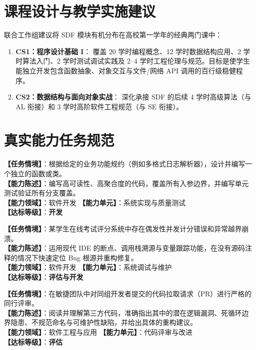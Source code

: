 \section{课程设计与教学实施建议}

联合工作组建议将 SDF 模块有机分布在高校第一学年的经典两门课中：
\begin{enumerate}
    \item \textbf{CS1：程序设计基础 I}：
    覆盖 20 学时编程概念、12 学时数据结构应用、2 学时算法入门、2 学时测试调试实践及 2--4 学时工程伦理与规范。目标是使学生能独立开发包含函数抽象、对象交互与文件/网络 API 调用的百行级稳健程序。
    \item \textbf{CS2：数据结构与面向对象实战}：
    深化承接 SDF 的后续 4 学时高级算法（与 AL 衔接）和 3 学时高阶软件工程规范（与 SE 衔接）。
\end{enumerate}

\section{真实能力任务规范}

\begin{taskbox}[任务 1：模块化功能组件的规范开发与单元测试]
\textbf{【任务情境】}：根据给定的业务功能规约（例如多格式日志解析器），设计并编写一个独立的函数或类。\\
\textbf{【能力陈述】}：编写高可读性、高聚合度的代码，覆盖所有入参边界，并编写单元测试验证所有分支覆盖。\\
\textbf{【能力领域】}：软件开发 \quad \textbf{【能力单元】}：系统实现与质量测试\\
\textbf{【达标等级】}：\textbf{开发}
\end{taskbox}

\begin{taskbox}[任务 2：复杂逻辑缺陷的断点调试与定位修复]
\textbf{【任务情境】}：某学生在线考试评分系统中存在偶发性并发计分错误和异常越界崩溃。\\
\textbf{【能力陈述】}：运用现代 IDE 的断点、调用栈溯源与变量跟踪功能，在没有源码注释的情况下快速定位 Bug 根源并重构修复。\\
\textbf{【能力领域】}：软件开发 \quad \textbf{【能力单元】}：系统调试与维护\\
\textbf{【达标等级】}：\textbf{评估与开发}
\end{taskbox}

\begin{taskbox}
\textbf{【任务情境】}：在敏捷团队中对同组开发者提交的代码拉取请求（PR）进行严格的同行评审。\\
\textbf{【能力陈述】}：阅读并理解第三方代码，准确指出其中的潜在逻辑漏洞、死循环边界隐患、不规范命名与可维护性缺陷，并给出具体的重构建议。\\
\textbf{【能力领域】}：软件工程与应用 \quad \textbf{【能力单元】}：代码评审与改进\\
\textbf{【达标等级】}：\textbf{评估}
\end{taskbox}

